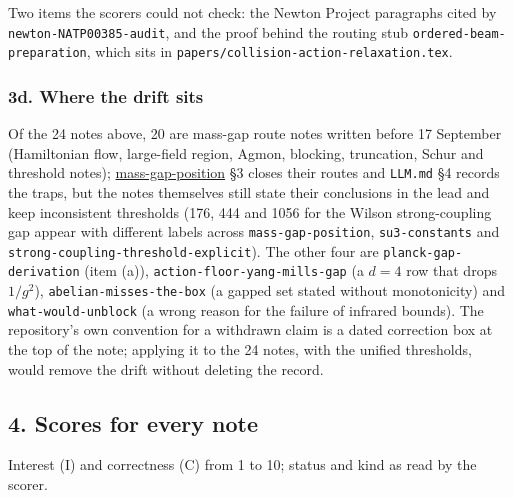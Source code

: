 \documentclass[11pt,a4paper]{article}
\begin{document}
Two items the scorers could not check: the Newton Project paragraphs
cited by \texttt{newton-NATP00385-audit}, and the proof behind the
routing stub \texttt{ordered-beam-preparation}, which sits in
\texttt{papers/collision-action-relaxation.tex}.

\hypertarget{d.-where-the-drift-sits}{%
\subsubsection{3d. Where the drift sits}\label{d.-where-the-drift-sits}}

Of the 24 notes above, 20 are mass-gap route notes written before 17
September (Hamiltonian flow, large-field region, Agmon, blocking,
truncation, Schur and threshold notes);
\href{mass-gap-obligations-lattice.md\#existing-estimates-and-examined-routes}{mass-gap-position}
§3 closes their routes and \texttt{LLM.md} §4 records the traps, but the
notes themselves still state their conclusions in the lead and keep
inconsistent thresholds (176, 444 and 1056 for the Wilson
strong-coupling gap appear with different labels across
\texttt{mass-gap-position}, \texttt{su3-constants} and
\texttt{strong-coupling-threshold-explicit}). The other four are
\texttt{planck-gap-derivation} (item (a)),
\texttt{action-floor-yang-mills-gap} (a \(d=4\) row that drops
\(1/g^2\)), \texttt{abelian-misses-the-box} (a gapped set stated without
monotonicity) and \texttt{what-would-unblock} (a wrong reason for the
failure of infrared bounds). The repository's own convention for a
withdrawn claim is a dated correction box at the top of the note;
applying it to the 24 notes, with the unified thresholds, would remove
the drift without deleting the record.

\hypertarget{scores-for-every-note}{%
\subsection{4. Scores for every note}\label{scores-for-every-note}}

Interest (I) and correctness (C) from 1 to 10; status and kind as read
by the scorer.
\end{document}
